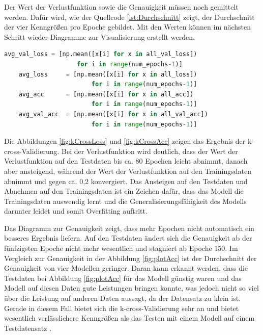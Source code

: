 Der Wert der Verlustfunktion sowie die Genauigkeit müssen noch gemittelt werden. Dafür wird, wie der Quellcode \ref*{lst:Durchschnitt} zeigt, der Durchschnitt 
der vier Kenngrößen pro Epoche gebildet. Mit den Werten können im nächsten Schritt wieder Diagramme zur Visualisierung erstellt werden.
\begin{lstlisting}[language = python, caption={Mitteln der Ergebnisse \cite{DL_PY}},captionpos=b, label = lst:Durchschnitt, floatplacement=H]
    avg_val_loss = [np.mean([x[i] for x in all_val_loss])
                    for i in range(num_epochs-1)]
    avg_loss     = [np.mean([x[i] for x in all_loss])
                        for i in range(num_epochs-1)]
    avg_acc      = [np.mean([x[i] for x in all_acc])
                        for i in range(num_epochs-1)]
    avg_val_acc  = [np.mean([x[i] for x in all_val_acc])
                        for i in range(num_epochs-1)]
\end{lstlisting}
Die Abbildungen \ref*{fig:kCrossLoss} und \ref*{fig:kCrossAcc} zeigen das Ergebnis der k-cross-Validierung. Bei der Verlustfunktion wird deutlich, dass
der Wert der Verlustfunktion auf den Testdaten bis ca. 80 Epochen leicht abnimmt, danach aber ansteigend, während der Wert der Verlustfunktion 
auf den Trainingsdaten abnimmt und gegen ca. 0,2 konvergiert. Das Ansteigen auf den Testdaten und Abnehmen auf den Trainingsdaten ist ein Zeichen dafür,
dass das Modell die Trainingsdaten auswendig lernt und die Generalisierungsfähigkeit des Modells darunter leidet und somit Overfitting auftritt.

Das Diagramm zur Genauigkeit zeigt, dass mehr Epochen nicht automatisch ein besseres Ergebnis liefern. Auf den Testdaten ändert sich die Genauigkeit 
ab der fünfzigsten Epoche nicht mehr wesentlich und stagniert ab Epoche 150. Im Vergleich zur Genauigkeit in der Abbildung \ref*{fig:plotAcc} 
ist der Durchschnitt der Genauigkeit von vier Modellen geringer. Daran kann erkannt werden, dass die Testdaten bei Abbildung \ref*{fig:plotAcc} für das Modell günstig 
waren und das Modell auf diesen Daten gute Leistungen bringen konnte, was jedoch nicht so viel über die Leistung auf anderen Daten aussagt, da der Datensatz zu klein ist. 
Gerade in diesem Fall bietet sich die k-cross-Validierung sehr an und bietet wesentlich verlässlichere Kenngrößen als das Testen mit einem Modell auf einem 
Testdatensatz \cite[vgl. S.123]{DL_PY}.

